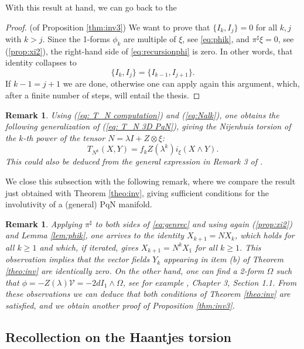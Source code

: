 \documentclass[12pt]{article}
\newtheorem{remark}[theorem]{Remark}
\begin{document}
With this result at hand, we can go back to the
\begin{proof}(of %
	Proposition \ref{thm:inv3}) We want to prove that $\{I_k,I_j\}=0$ for all $k,j$ with $k>j$. 
	Since the 1-forms $\phi_k$ are multiple of $\xi$, see \eqref{eq:phik}, and $\pi^\sharp\xi=0$, see (\ref{prop:xi2}),
	the right-hand side of \eqref{eq:recursionphi} is %
	zero. In other words, that identity collapses to
	\[
	\{I_k,I_j\}=\{I_{k-1},I_{j+1}\}.
	\] 
	If $k-1=j+1$ we are done, otherwise one can apply again this argument, which, after a finite number of steps, will entail the thesis.
\end{proof}

\begin{remark} 
	\label{rem:torsion-of-k-power}
	Using (\ref{eq: T_N computation}) and (\ref{eq:Nalk}), one obtains the following 
	generalization of (\ref{eq: T_N 3D PqN}), giving the Nijenhuis torsion of the $k$-th power of the tensor 
	$N=\lambda I+Z\otimes\xi$:
	\begin{equation}
		T_{N^k}(X,Y)=f_k Z(\lambda^k)i_\xi(X\wedge Y).\label{eq: T_N 3D PqN-k}
	\end{equation}
	This could also be deduced from the general expression in Remark 3 of \cite{BogoTens}.
\end{remark}

We close this subsection with the following remark, where we compare the result just obtained with Theorem \ref{theo:inv}, giving sufficient conditions for the involutivity of a (general) PqN manifold.
\begin{remark} \label{rem:FMP2024}
	Applying $\pi^\sharp$ to both sides of \eqref{eq:genrec} and using again (\ref{prop:xi2}) and Lemma \ref{lem:phik}, one arrives to the identity $X_{k+1}=N X_k$, which holds for all $k\geq 1$ and which, if iterated, gives $X_{k+1}=N^{k}X_1$ for all $k\geq 1$.
	This observation implies that the vector fields $Y_k$ appearing in item (b) of Theorem \ref{theo:inv} are identically zero. 
	On the other hand, one can find a 2-form $\Omega$ such that $\phi=-Z(\lambda)\mathcal V=-2dI_1\wedge\Omega$, see for example \cite{Pham}, Chapter 3, Section 1.1. From these observations we can deduce that both conditions of Theorem \ref{theo:inv} are satisfied, and we obtain another proof of %
	Proposition \ref{thm:inv3}.  
\end{remark}

\subsection{Recollection on the Haantjes torsion}\label{ss:haantjes}
\end{document}
